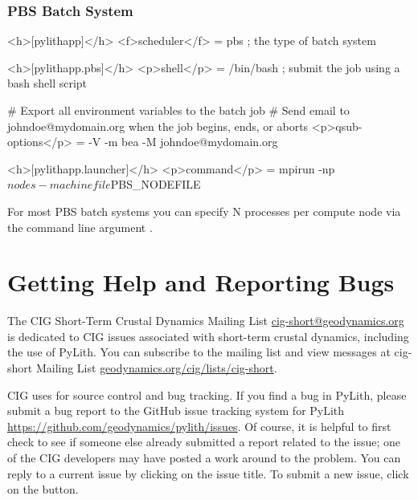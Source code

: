 \subsubsection{PBS Batch System}
\begin{cfg}
<h>[pylithapp]</h>
<f>scheduler</f> = pbs     ; the type of batch system

<h>[pylithapp.pbs]</h>
<p>shell</p> = /bin/bash     ; submit the job using a bash shell script

# Export all environment variables to the batch job
# Send email to johndoe@mydomain.org when the job begins, ends, or aborts
<p>qsub-options</p> = -V -m bea -M johndoe@mydomain.org

<h>[pylithapp.launcher]</h>
<p>command</p> = mpirun -np ${nodes} -machinefile ${PBS_NODEFILE}
\end{cfg}
For most PBS batch systems you can specify N processes per compute
node via the command line argument .

\section{Getting Help and Reporting Bugs}
\label{sec:help}

The CIG Short-Term
Crustal Dynamics Mailing List \url{cig-short@geodynamics.org} is
dedicated to CIG issues associated with short-term crustal dynamics,
including the use of PyLith. You can subscribe to the mailing list and
view messages at cig-short Mailing List
\url{geodynamics.org/cig/lists/cig-short}.

CIG uses  for source control and bug tracking. If you
find a bug in PyLith, please submit a bug report to the GitHub issue
tracking system for PyLith \url{https://github.com/geodynamics/pylith/issues}.
Of course, it is helpful to first check to see if someone else already
submitted a report related to the issue; one of the CIG developers
may have posted a work around to the problem. You can reply to a current
issue by clicking on the issue title. To submit a new issue, click
on the  button.


